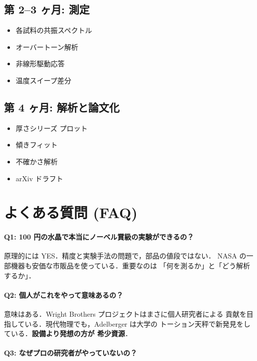 \documentclass[11pt,a4paper]{article}
\begin{document}
\subsection{第 2--3 ヶ月: 測定}

\begin{itemize}
\item 各試料の共振スペクトル
\item オーバートーン解析
\item 非線形駆動応答
\item 温度スイープ差分
\end{itemize}

\subsection{第 4 ヶ月: 解析と論文化}

\begin{itemize}
\item 厚さシリーズ プロット
\item 傾きフィット
\item 不確かさ解析
\item arXiv ドラフト
\end{itemize}

\section{よくある質問 (FAQ)}

\paragraph{Q1: 100 円の水晶で本当にノーベル賞級の実験ができるの？}

原理的には YES．精度と実験手法の問題で，部品の値段ではない．
NASA の一部機器も安価な市販品を使っている．重要なのは
「何を測るか」と「どう解析するか」．

\paragraph{Q2: 個人がこれをやって意味あるの？}

意味はある．Wright Brothers プロジェクトはまさに個人研究者による
貢献を目指している．現代物理でも，Adelberger は大学の
トーション天秤で新発見をしている．\textbf{設備より発想の方が
希少資源}．

\paragraph{Q3: なぜプロの研究者がやっていないの？}
\end{document}
